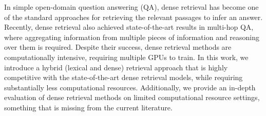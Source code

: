 In simple open-domain question answering (QA), dense retrieval has become one of the standard approaches for retrieving the relevant passages to infer an answer. Recently, dense retrieval also achieved state-of-the-art results in multi-hop QA, where aggregating information from multiple pieces of information and reasoning over them is required. Despite their success, dense retrieval methods are computationally intensive, requiring multiple GPUs to train. In this work, we introduce a hybrid (lexical and dense) retrieval approach that is highly competitive with the state-of-the-art dense retrieval models, while requiring substantially less computational resources. Additionally, we provide an in-depth evaluation of dense retrieval methods on limited computational resource settings, something that is missing from the current literature.
